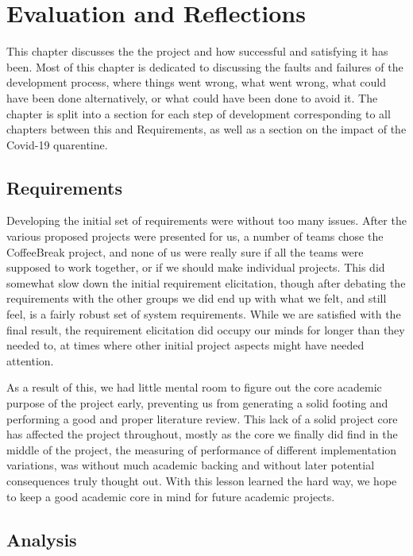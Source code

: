 \chapter{Evaluation and Reflections}

This chapter discusses the the project and how successful and satisfying it has been. Most of this chapter is dedicated to discussing the faults and failures of the development process, where things went wrong, what went wrong, what could have been done alternatively, or what could have been done to avoid it. The chapter is split into a section for each step of development corresponding to all chapters between this and Requirements, as well as a section on the impact of the Covid-19 quarentine.

\section{Requirements}

Developing the initial set of requirements were without too many issues. After the various proposed projects were presented for us, a number of teams chose the CoffeeBreak project, and none of us were really sure if all the teams were supposed to work together, or if we should make individual projects. This did somewhat slow down the initial requirement elicitation, though after debating the requirements with the other groups we did end up with what we felt, and still feel, is a fairly robust set of system requirements. While we are satisfied with the final result, the requirement elicitation did occupy our minds for longer than they needed to, at times where other initial project aspects might have needed attention.

As a result of this, we had little mental room to figure out the core academic purpose of the project early, preventing us from generating a solid footing and performing a good and proper literature review. This lack of a solid project core has affected the project throughout, mostly as the core we finally did find in the middle of the project, the measuring of performance of different implementation variations, was without much academic backing and without later potential consequences truly thought out. With this lesson learned the hard way, we hope to keep a good academic core in mind for future academic projects.

\section{Analysis}

